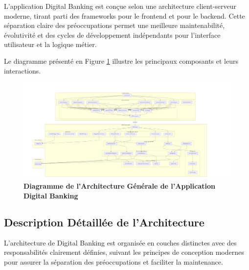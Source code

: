 \documentclass[10pt]{article}
\begin{document}
\sectiondivider

\begin{primarybox}[title=Vue d'ensemble]
    L'application Digital Banking est conçue selon une architecture client-serveur moderne, 
    tirant parti des frameworks  pour le frontend et 
     pour le backend. Cette séparation claire des préoccupations 
    permet une meilleure maintenabilité, évolutivité et des cycles de développement indépendants 
    pour l'interface utilisateur et la logique métier.
    
    Le diagramme présenté en Figure \ref{fig:architecture_diagram} illustre les principaux 
    composants et leurs interactions.
\end{primarybox}

\begin{landscape}
\begin{figure}[p] %
    \centering
    \begin{imagebox}
        \includegraphics[width=0.98\linewidth]{screenshots/architecture_diagram.png}
    \end{imagebox}
    \caption{\textbf{Diagramme de l'Architecture Générale de l'Application Digital Banking}}
    \label{fig:architecture_diagram}
\end{figure}
\end{landscape}

\subsection{Description Détaillée de l'Architecture}

\begin{infobox}[title=Organisation de l'Architecture]
    L'architecture de Digital Banking est organisée en couches distinctes avec des responsabilités 
    clairement définies, suivant les principes de conception modernes pour assurer la séparation 
    des préoccupations et faciliter la maintenance.
\end{infobox}
\end{document}
